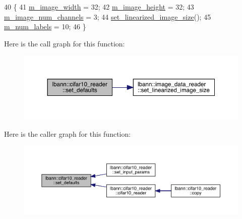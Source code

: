 \begin{DoxyCode}
40                                   \{
41   \hyperlink{classlbann_1_1image__data__reader_af001f3d1c0f1c580b66988233b3a64f0}{m\_image\_width} = 32;
42   \hyperlink{classlbann_1_1image__data__reader_a0632efa3deaa9d61e671f741909eb3fe}{m\_image\_height} = 32;
43   \hyperlink{classlbann_1_1image__data__reader_aab1a440f361521dc7bd583cefe1061f8}{m\_image\_num\_channels} = 3;
44   \hyperlink{classlbann_1_1image__data__reader_a0164b0e3abbe92daef73b36fb925403e}{set\_linearized\_image\_size}();
45   \hyperlink{classlbann_1_1image__data__reader_af280e8758a6ec3acee7c62e6351d17e0}{m\_num\_labels} = 10;
46 \}
\end{DoxyCode}
Here is the call graph for this function\+:\nopagebreak
\begin{figure}[H]
\begin{center}
\leavevmode
\includegraphics[width=350pt]{classlbann_1_1cifar10__reader_a4c5389d0a6641716c96aa07e58fa4e88_cgraph}
\end{center}
\end{figure}
Here is the caller graph for this function\+:\nopagebreak
\begin{figure}[H]
\begin{center}
\leavevmode
\includegraphics[width=350pt]{classlbann_1_1cifar10__reader_a4c5389d0a6641716c96aa07e58fa4e88_icgraph}
\end{center}
\end{figure}
\mbox{\label{classlbann_1_1cifar10__reader_a3915005f1278a840869b8519c30c808b}} 
